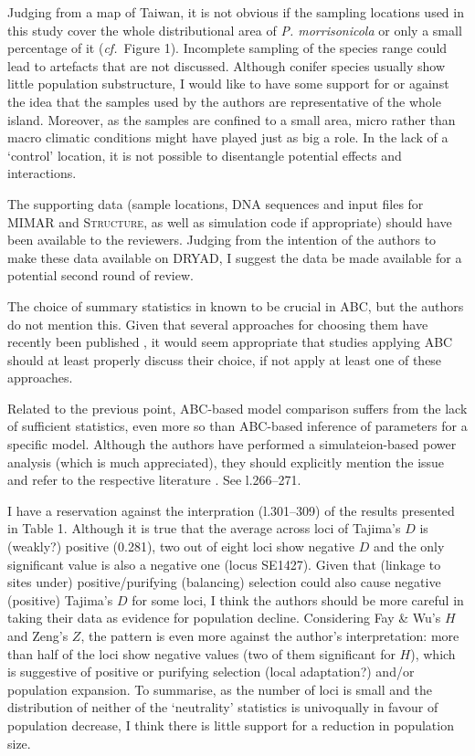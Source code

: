\documentclass[11pt]{article}
\newenvironment{my_enumerate}
{\begin{enumerate}
  \setlength{\itemsep}{2pt}
  \setlength{\parskip}{0pt}
  \setlength{\parsep}{0pt}}
{\end{enumerate}}
\begin{document}
\begin{my_enumerate}
	\item Judging from a map of Taiwan, it is not obvious if the sampling locations used in this study cover the whole distributional area of \emph{P. morrisonicola} or only a small percentage of it (\emph{cf.}\ Figure 1). Incomplete sampling of the species range could lead to artefacts that are not discussed. Although conifer species usually show little population substructure, I would like to have some support for or against the idea that the samples used by the authors are representative of the whole island. Moreover, as the samples are confined to a small area, micro rather than macro climatic conditions might have played just as big a role. In the lack of a `control' location, it is not possible to disentangle potential effects and interactions.
	\item The supporting data (sample locations, DNA sequences and input files for \textsc{MIMAR} and \textsc{Structure}, as well as simulation code if appropriate) should have been available to the reviewers. Judging from the intention of the authors to make these data available on DRYAD, I suggest the data be made available for a potential second round of review.
	\item The choice of summary statistics in known to be crucial in ABC, but the authors do not mention this. Given that several approaches for choosing them have recently been published \citep[][]{Joyce:2008sf, Wegmann:2009sf, Nunes:2010fk, Fearnhead:2011uq,Aeschbacher:2011fk}, it would seem appropriate that studies applying ABC should at least properly discuss their choice, if not apply at least one of these approaches.
	\item Related to the previous point, ABC-based model comparison suffers from the lack of sufficient statistics, even more so than ABC-based inference of parameters for a specific model. Although the authors have performed a simulateion-based power analysis (which is much appreciated), they should explicitly mention the issue and refer to the respective literature \cite[\emph{e.g.}][]{Robert:2011fk}. See l.266--271.
	\item I have a reservation against the interpration (l.301--309) of the results presented in Table 1. Although it is true that the average across loci of Tajima's $D$ is (weakly?) positive (0.281), two out of eight loci show negative $D$ and the only significant value is also a negative one (locus SE1427). Given that (linkage to sites under) positive/purifying (balancing) selection could also cause negative (positive) Tajima's $D$ for some loci, I think the authors should be more careful in taking their data as evidence for population decline. Considering Fay \& Wu's $H$ and Zeng's $Z$, the pattern is even more against the author's interpretation: more than half of the loci show negative values (two of them significant for $H$), which is suggestive of positive or purifying selection (local adaptation?) and/or population expansion. To summarise, as the number of loci is small and the distribution of neither of the `neutrality' statistics is univoqually in favour of population decrease, I think there is little support for a reduction in population size.

\end{my_enumerate}
\end{document}
